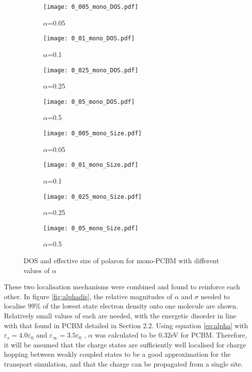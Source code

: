 \documentclass[a4paper,12pt]{article}
\begin{document}
\begin{figure}[H]
\centering
\begin{subfigure}[b]{0.24\textwidth}
\texttt{[image: 0\_005\_mono\_DOS.pdf]}
\caption{$\alpha$=0.05}
\end{subfigure}
\begin{subfigure}[b]{0.24\textwidth}
\texttt{[image: 0\_01\_mono\_DOS.pdf]}
\caption{$\alpha$=0.1}
\end{subfigure}
\begin{subfigure}[b]{0.24\textwidth}
\texttt{[image: 0\_025\_mono\_DOS.pdf]}
\caption{$\alpha$=0.25}
\end{subfigure}
\begin{subfigure}[b]{0.24\textwidth}
\texttt{[image: 0\_05\_mono\_DOS.pdf]}
\caption{$\alpha$=0.5}
\end{subfigure}
\begin{subfigure}[b]{0.24\textwidth}
\texttt{[image: 0\_005\_mono\_Size.pdf]}
\caption{$\alpha$=0.05}
\end{subfigure}
\begin{subfigure}[b]{0.24\textwidth}
\texttt{[image: 0\_01\_mono\_Size.pdf]}
\caption{$\alpha$=0.1}
\end{subfigure}
\begin{subfigure}[b]{0.24\textwidth}
\texttt{[image: 0\_025\_mono\_Size.pdf]}
\caption{$\alpha$=0.25}
\end{subfigure}
\begin{subfigure}[b]{0.24\textwidth}
\texttt{[image: 0\_05\_mono\_Size.pdf]}
\caption{$\alpha$=0.5}
\end{subfigure}
\caption{DOS and effective size of polaron for mono-PCBM with different values of $\alpha$}
\label{fig:alphamono}
\end{figure}

\noindent These two localisation mechanisms were combined and found to reinforce each other. In figure \ref{fig:alphadis}, the relative magnitudes of $\alpha$ and $\sigma$ needed to localise 99\% of the lowest state electron density onto one molecule are shown. Relatively small values of each are needed, with the energetic disorder in line with that found in PCBM detailed in Section 2.2. Using equation \ref{eq:alpha} with $\varepsilon_s=4.0\varepsilon_0$ \cite{jkoster} and $\varepsilon_\infty=3.5\varepsilon_0$ \cite{Guilbert2014}, $\alpha$ was calculated to be 0.32eV for PCBM. Therefore, it will be assumed that the charge states are sufficiently well localised for charge hopping between weakly coupled states to be a good approximation for the transport simulation, and that the charge can be propagated from a single site.\\
\end{document}
